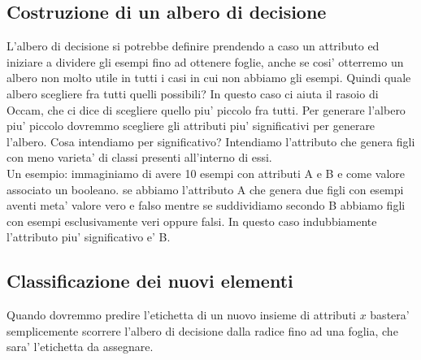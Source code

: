 \subsection{Costruzione di un albero di decisione}
L'albero di decisione si potrebbe definire prendendo a caso un attributo ed iniziare a dividere gli esempi fino ad ottenere foglie, anche se cosi' otterremo un albero  non molto utile in tutti i casi in cui non abbiamo gli esempi. Quindi quale albero scegliere fra tutti quelli possibili? In questo caso ci aiuta il rasoio di Occam, che ci dice di scegliere quello piu' piccolo fra tutti. Per generare l'albero piu' piccolo dovremmo scegliere gli attributi piu' significativi per generare l'albero. Cosa intendiamo per significativo? Intendiamo l'attributo che genera figli con meno varieta' di classi presenti all'interno di essi.\\ Un esempio: immaginiamo di avere 10 esempi con attributi A e B e come valore associato un booleano. se abbiamo l'attributo A che genera due figli con esempi aventi meta' valore vero e falso mentre se suddividiamo secondo B abbiamo figli con esempi esclusivamente veri oppure falsi. In questo caso indubbiamente l'attributo piu' significativo e' B.

\subsection{Classificazione dei nuovi elementi}
Quando dovremmo predire l'etichetta di un nuovo insieme di attributi $x$ bastera' semplicemente scorrere l'albero di decisione dalla radice fino ad una foglia, che sara' l'etichetta da assegnare.

